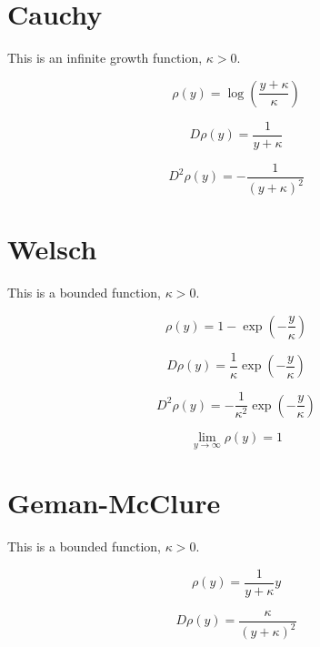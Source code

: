 \documentclass{article}
\begin{document}
\section{Cauchy}

This is an infinite growth function, $\kappa > 0$.

\begin{equation}
	\rho(y) = \log{\left( \frac{y + \kappa}{\kappa} \right)}
\end{equation}

\begin{equation}
	D\rho(y) = \frac{1}{y + \kappa}
\end{equation}

\begin{equation}
	D^2 \rho(y) = -\frac{1}{(y + \kappa)^2}
\end{equation}

\section{Welsch}

This is a bounded function, $\kappa > 0$.

\begin{equation}
	\rho(y) = 1 - \exp{ \left(-\frac{y}{\kappa} \right)}
\end{equation}

\begin{equation}
	D\rho(y) = \frac{1}{\kappa} \exp{ \left( -\frac{y}{\kappa} \right)}
\end{equation}

\begin{equation}
	D^2 \rho(y) = -\frac{1}{\kappa^2} \exp{ \left( -\frac{y}{\kappa} \right) }
\end{equation}

\begin{equation}
	\lim_{y \rightarrow \infty} \rho(y) = 1
\end{equation}

\section{Geman-McClure}

This is a bounded function, $\kappa > 0$.

\begin{equation}
	\rho \left( y \right) = \frac{1}{y + \kappa} y
\end{equation}

\begin{equation}
	D\rho \left( y \right) = \frac{\kappa}{ \left( y + \kappa \right)^2 }
\end{equation}
\end{document}
